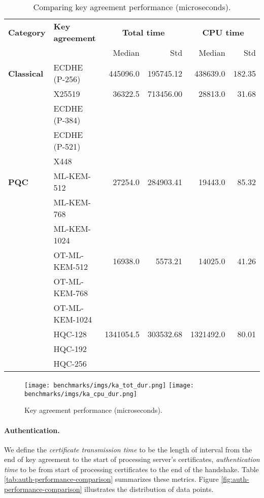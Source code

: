 \documentclass[letterpaper,12pt,titlepage,oneside,final]{book}
\begin{document}
\begin{table}[h]
\footnotesize
\centering
\begin{tabular}{llrrrr}
\toprule
    \textbf{Category}
    & \textbf{Key agreement}
    & \multicolumn{2}{c}{\textbf{Total time}}
    & \multicolumn{2}{c}{\textbf{CPU time}} \\
    \cmidrule(lr){3-4}
    \cmidrule(lr){5-6}
    & & Median & Std & Median & Std \\
\midrule
    \textbf{Classical} 
    & ECDHE (P-256) & 445096.0 & 195745.12 & 438639.0 & 182.35 \\
    & X25519 & 36322.5 & 713456.00 & 28813.0 & 31.68 \\
    & ECDHE (P-384) \\
    & ECDHE (P-521) \\
    & X448 \\
\midrule
    \textbf{PQC}
    & ML-KEM-512 & 27254.0 & 284903.41 & 19443.0 & 85.32\\
    & ML-KEM-768 \\
    & ML-KEM-1024 \\
    & OT-ML-KEM-512 & 16938.0 & 5573.21 & 14025.0 & 41.26 \\
    & OT-ML-KEM-768 \\
    & OT-ML-KEM-1024 \\
    & HQC-128 & 1341054.5 & 303532.68 & 1321492.0 & 80.01 \\
    & HQC-192 \\
    & HQC-256 \\
\bottomrule
\end{tabular}
\caption{Comparing key agreement performance (microseconds).}
\label{tab:ka-performance-comparison}
\end{table}

\begin{figure}[h]
    \centering
    \texttt{[image: benchmarks/imgs/ka\_tot\_dur.png]}
    \texttt{[image: benchmarks/imgs/ka\_cpu\_dur.png]}
    \caption{Key agreement performance (microseconds).}
    \label{fig:ka-performance-comparison}
\end{figure}

\paragraph{Authentication.}
We define the \textit{certificate transmission time} to be the length of interval from the end of key agreement to the start of processing server's certificates,
\textit{authentication time} to be from start of processing certificates to the end of the handshake.
Table \ref{tab:auth-performance-comparison} summarizes these metrics. Figure \ref{fig:auth-performance-comparison} illustrates the distribution of data points.
\end{document}
